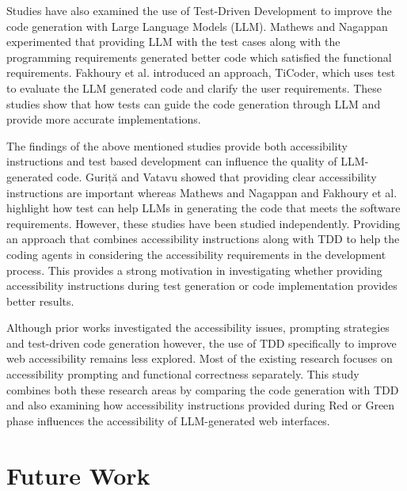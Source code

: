 \documentclass[conference]{IEEEtran}
\begin{document}
Studies have also examined the use of Test-Driven Development to improve the code generation with Large Language Models (LLM). Mathews and Nagappan \cite{mathews2024} experimented that providing LLM with the test cases along with the programming requirements generated better code which satisfied the functional requirements. Fakhoury et al. \cite{fakhoury2024} introduced an approach, TiCoder, which uses test to evaluate the LLM generated code and clarify the user requirements. These studies show that how tests can guide the code generation through LLM and provide more accurate implementations.  

The findings of the above mentioned studies provide both accessibility instructions and test based development can influence the quality of LLM-generated code. Guriță and Vatavu \cite{gurita2025} showed that providing clear accessibility instructions are important whereas Mathews and Nagappan \cite{mathews2024} and Fakhoury et al. \cite{fakhoury2024} highlight how test can help LLMs in generating the code that meets the software requirements. However, these studies have been studied independently. Providing an approach that combines accessibility instructions along with TDD to help the coding agents in considering the accessibility requirements in the development process. This provides a strong motivation in investigating whether providing accessibility instructions during test generation or code implementation provides better results.

Although prior works investigated the accessibility issues, prompting strategies and test-driven code generation however, the use of TDD specifically to improve web accessibility remains less explored. Most of the existing research focuses on accessibility prompting and functional correctness separately. This study combines both these research areas by comparing the code generation with TDD and also examining how accessibility instructions provided during Red or Green phase influences the accessibility of LLM-generated web interfaces.

\section{Future Work}
\end{document}

